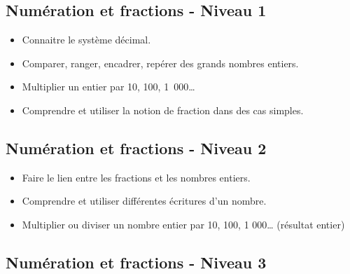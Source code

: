 \documentclass[a4paper,12pt,fleqn]{article}
\begin{document}
\renewcommand{\labelitemi}{}

\subsection*{Numération et fractions - Niveau 1}

\begin{itemize}
	\item {}Connaitre le système décimal.
	\item {}Comparer, ranger, encadrer, repérer des grands nombres entiers.
	\item {}Multiplier un entier par 10, 100, 1~000\ldots
	\item {}Comprendre et utiliser la notion de fraction dans des cas simples.

\end{itemize}

\subsection*{Numération et fractions - Niveau 2}

\begin{itemize}
	\item {}Faire le lien entre les fractions et les nombres entiers.
	\item {}Comprendre et utiliser différentes écritures d’un nombre.
	\item {}Multiplier ou diviser un nombre entier par 10, 100, 1 000… (résultat entier)
\end{itemize}

\subsection*{Numération et fractions - Niveau 3}
\end{document}
